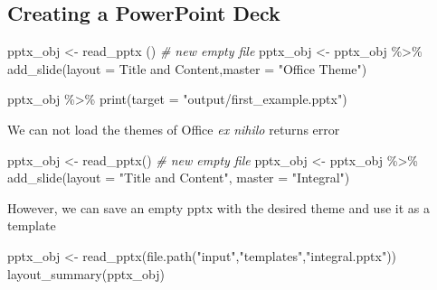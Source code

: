 \documentclass[
]{book}
\newenvironment{Shaded}{\begin{snugshade}}{\end{snugshade}}
\newcommand{\AttributeTok}[1]{\textcolor[rgb]{0.77,0.63,0.00}{#1}}
\newcommand{\CommentTok}[1]{\textcolor[rgb]{0.56,0.35,0.01}{\textit{#1}}}
\newcommand{\FunctionTok}[1]{\textcolor[rgb]{0.00,0.00,0.00}{#1}}
\newcommand{\NormalTok}[1]{#1}
\newcommand{\OtherTok}[1]{\textcolor[rgb]{0.56,0.35,0.01}{#1}}
\newcommand{\SpecialCharTok}[1]{\textcolor[rgb]{0.00,0.00,0.00}{#1}}
\newcommand{\StringTok}[1]{\textcolor[rgb]{0.31,0.60,0.02}{#1}}
\begin{document}
\hypertarget{creating-a-powerpoint-deck}{%
\subsection{Creating a PowerPoint Deck}\label{creating-a-powerpoint-deck}}

\begin{Shaded}
\begin{Highlighting}[]
\NormalTok{pptx\_obj }\OtherTok{\textless{}{-}} \FunctionTok{read\_pptx}\NormalTok{ () }\CommentTok{\# new empty file}
\NormalTok{pptx\_obj }\OtherTok{\textless{}{-}}\NormalTok{ pptx\_obj }\SpecialCharTok{\%\textgreater{}\%} 
  \FunctionTok{add\_slide}\NormalTok{(}\AttributeTok{layout  =} \StringTok{\textquotesingle{}Title and Content\textquotesingle{}}\NormalTok{,}\AttributeTok{master =} \StringTok{"Office Theme"}\NormalTok{)}

\NormalTok{pptx\_obj }\SpecialCharTok{\%\textgreater{}\%} \FunctionTok{print}\NormalTok{(}\AttributeTok{target =} \StringTok{"output/first\_example.pptx"}\NormalTok{)}
\end{Highlighting}
\end{Shaded}

We can not load the themes of Office \emph{ex nihilo} returns error

\begin{Shaded}
\begin{Highlighting}[]
\NormalTok{pptx\_obj }\OtherTok{\textless{}{-}} \FunctionTok{read\_pptx}\NormalTok{() }\CommentTok{\# new empty file}
\NormalTok{pptx\_obj }\OtherTok{\textless{}{-}}\NormalTok{ pptx\_obj }\SpecialCharTok{\%\textgreater{}\%} 
  \FunctionTok{add\_slide}\NormalTok{(}\AttributeTok{layout =} \StringTok{"Title and Content"}\NormalTok{, }\AttributeTok{master =} \StringTok{"Integral"}\NormalTok{)}
\end{Highlighting}
\end{Shaded}

However, we can save an empty pptx with the desired theme and use it as a template

\begin{Shaded}
\begin{Highlighting}[]
\NormalTok{pptx\_obj }\OtherTok{\textless{}{-}} \FunctionTok{read\_pptx}\NormalTok{(}\FunctionTok{file.path}\NormalTok{(}\StringTok{"input"}\NormalTok{,}\StringTok{"templates"}\NormalTok{,}\StringTok{"integral.pptx"}\NormalTok{))}
\FunctionTok{layout\_summary}\NormalTok{(pptx\_obj)}
\end{Highlighting}
\end{Shaded}
\end{document}
